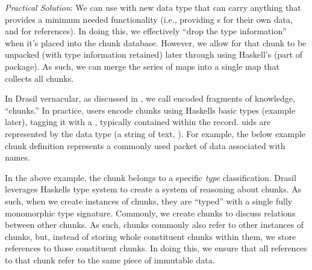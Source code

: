 \begin{writingdirectives}
      \item \textit{Practical Solution}: We can use \ExistentialQuantification{}
            with new data type that can carry anything that provides a minimum
            needed functionality (i.e., providing \UID{}s for their own data,
            and for references). In doing this, we effectively ``drop the type
            information'' when it's placed into the chunk database. However, we
            allow for that chunk to be unpacked (with type information retained)
            later through using Haskell's  (part of
             package). As such, we can merge the series of maps
            into a single map that collects all chunks.

\end{writingdirectives}

In Drasil vernacular, as discussed in , we call encoded
fragments of knowledge, ``chunks.'' In practice, users encode chunks using
Haskells basic  types (example later), tagging it with a
, typically contained within the record. \acsp{uid} are represented by
the \UID{} data type (a string of text, ). For example,
 the below example chunk definition
represents a commonly used packet of data associated with names.


In the above example, the chunk belongs to a specific \textit{type}
classification. Drasil
leverages Haskells type system to create a system of reasoning about chunks. As
such, when we create instances of chunks, they are ``typed'' with a single fully
monomorphic type signature. Commonly, we create chunks to discuss relations
between other chunks. As such, chunks commonly also refer to other instances of
chunks, but, instead of storing whole constituent chunks within them, we store
\UID{} references to those constituent chunks. In doing this, we ensure that all
references to that chunk refer to the same piece of immutable data.


